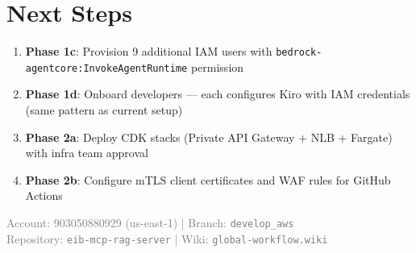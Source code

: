 \documentclass[11pt,letterpaper]{article}
\begin{document}
\section{Next Steps}

\begin{enumerate}[leftmargin=*]
    \item \textbf{Phase 1c}: Provision 9 additional IAM users with \texttt{bedrock-agentcore:InvokeAgentRuntime} permission
    \item \textbf{Phase 1d}: Onboard developers — each configures Kiro with IAM credentials (same pattern as current setup)
    \item \textbf{Phase 2a}: Deploy CDK stacks (Private API Gateway + NLB + Fargate) with infra team approval
    \item \textbf{Phase 2b}: Configure mTLS client certificates and WAF rules for GitHub Actions
\end{enumerate}

\vfill
\begin{center}
\small\textcolor{gray}{%
    Account: 903050880929 (us-east-1) | Branch: \texttt{develop\_aws}\\
    Repository: \texttt{eib-mcp-rag-server} | Wiki: \texttt{global-workflow.wiki}
}
\end{center}
\end{document}
